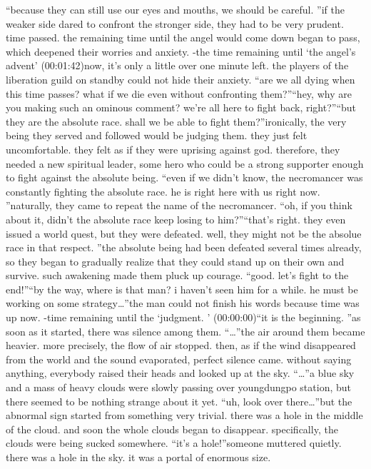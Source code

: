 “because they can still use our eyes and mouths, we should be careful.
”if the weaker side dared to confront the stronger side, they had to be very prudent.
time passed.
 the remaining time until the angel would come down began to pass, which deepened their worries and anxiety.
-the time remaining until ‘the angel’s advent’ (00:01:42)now, it’s only a little over one minute left.
 the players of the liberation guild on standby could not hide their anxiety.
“are we all dying when this time passes? what if we die even without confronting them?”“hey, why are you making such an ominous comment? we’re all here to fight back, right?”“but they are the absolute race.
 shall we be able to fight them?”ironically, the very being they served and followed would be judging them.
 they just felt uncomfortable.
 they felt as if they were uprising against god.
therefore, they needed a new spiritual leader, some hero who could be a strong supporter enough to fight against the absolute being.
“even if we didn’t know, the necromancer was constantly fighting the absolute race.
 he is right here with us right now.
”naturally, they came to repeat the name of the necromancer.
“oh, if you think about it, didn’t the absolute race keep losing to him?”“that’s right.
 they even issued a world quest, but they were defeated.
 well, they might not be the absolue race in that respect.
”the absolute being had been defeated several times already, so they began to gradually realize that they could stand up on their own and survive.
 such awakening made them pluck up courage.
“good.
 let’s fight to the end!”“by the way, where is that man? i haven’t seen him for a while.
 he must be working on some strategy…”the man could not finish his words because time was up now.
-time remaining until the ‘judgment.
’ (00:00:00)“it is the beginning.
”as soon as it started, there was silence among them.
“…”the air around them became heavier.
more precisely, the flow of air stopped.
 then, as if the wind disappeared from the world and the sound evaporated, perfect silence came.
without saying anything, everybody raised their heads and looked up at the sky.
“…”a blue sky and a mass of heavy clouds were slowly passing over youngdungpo station, but there seemed to be nothing strange about it yet.
“uh, look over there…”but the abnormal sign started from something very trivial.
 there was a hole in the middle of the cloud.
 and soon the whole clouds began to disappear.
 specifically, the clouds were being sucked somewhere.
“it’s a hole!”someone muttered quietly.
 there was a hole in the sky.
 it was a portal of enormous size.


